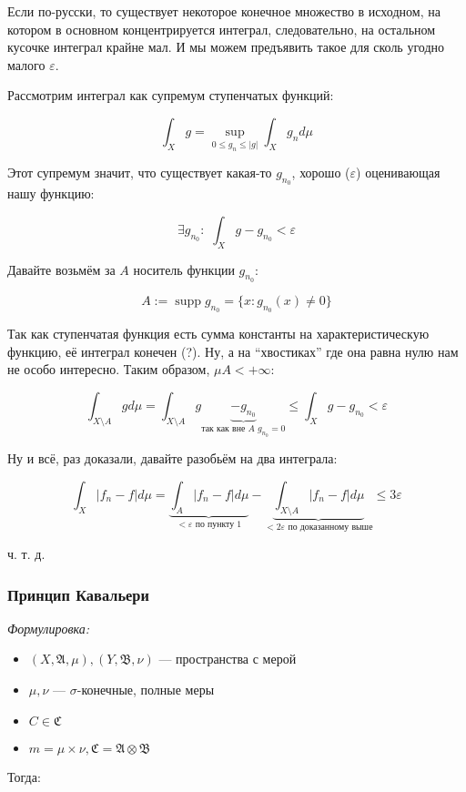 \documentclass{article}
\def\dbl{\,\,}
\DeclareMathOperator{\supp}{supp}
\begin{document}
Если по-русски, то существует некоторое конечное  множество в исходном, на котором в основном концентрируется интеграл, следовательно, на остальном кусочке интеграл крайне мал. И мы можем предъявить такое для сколь угодно малого $\varepsilon$.

Рассмотрим интеграл как супремум ступенчатых функций:

\[\int_{X} g = \sup_{0 \le g_n \le |g|} \int_{X} g_n d\mu\]

Этот супремум значит, что существует какая-то $g_{n_0}$, хорошо ($\varepsilon$) оценивающая нашу функцию:

\[\exists g_{n_0}: \dbl \int_{X} g - g_{n_0} < \varepsilon\]

Давайте возьмём за $A$ носитель функции $g_{n_0}$:

\[A := \supp g_{n_0} = \{x: g_{n_0}(x) \neq 0\}\]

Так как ступенчатая функция есть сумма константы на характеристическую функцию, её интеграл конечен (?). Ну, а на ``хвостиках'' где она равна нулю нам не особо интересно. Таким образом, $\mu A < + \infty$:

\[\int_{X \setminus A} g d\mu = \int_{X \setminus A} g \underbrace{- g_{n_0}}_{\text{так как вне } A \,\, g_{n_0} = 0} \le \int_{X} g - g_{n_0} < \varepsilon\]

Ну и всё, раз доказали, давайте разобьём на два интеграла:

\[\int_{X} |f_n - f| d\mu = \underbrace{\int_{A} |f_n - f| d\mu}_{< \varepsilon \text{ по пункту 1}} - \underbrace{\int_{X \setminus A} |f_n - f| d\mu}_{<2 \varepsilon \text{ по доказанному выше}} \le 3 \varepsilon\]

ч. т. д. 

\subsubsection{Принцип Кавальери}
\textit{Формулировка:}

\begin{itemize}
    \item $(X, \mathfrak{A}, \mu), (Y, \mathfrak{B}, \nu)$ --- пространства с мерой
    \item $\mu, \nu$ --- $\sigma$-конечные, полные меры
    \item $C \in \mathfrak{C}$
    \item $m = \mu \times \nu, \mathfrak{C} = \mathfrak{A} \otimes \mathfrak{B}$
\end{itemize}

Тогда: 
\end{document}
